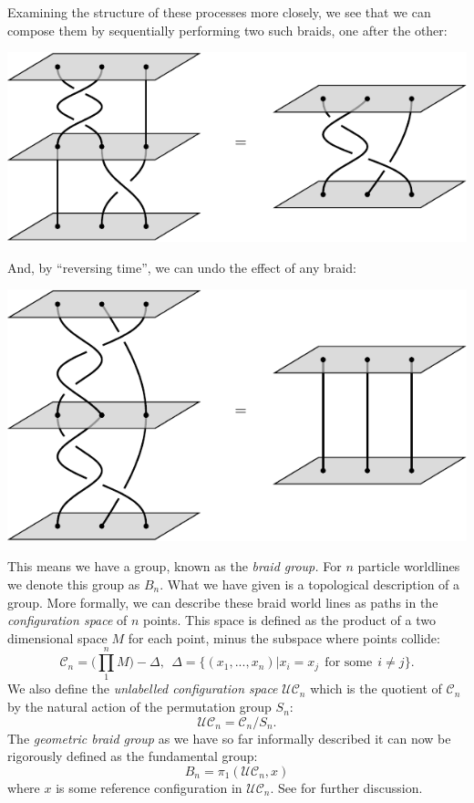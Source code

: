 \documentclass[aps, prl, letterpaper, twocolumn, superscriptaddress, notitlepage, 10pt]{revtex4-1}
\begin{document}
Examining the structure of these processes more closely,
we see that we can compose them by sequentially performing
two such braids, one after the other:
\begin{center}
\includegraphics[]{pic-braid-compose.pdf}
\end{center}
And, by ``reversing time'', we can undo the effect of
any braid:
\begin{center}
\includegraphics[]{pic-braid-inverse.pdf}
\end{center}
This means we have a group, known as the \emph{braid group.}
For $n$ particle worldlines we denote this group as $B_n.$
What we have given is a topological description of a group.
More formally, we can describe these braid world lines as
paths in the \emph{configuration space} of $n$ points.
\newcommand{\Conf}{\mathcal{C}}
\newcommand{\UConf}{\mathcal{UC}}
This space is defined as the product of
a two dimensional space $M$ for each point, minus the subspace where points collide:
$$
    \Conf_n = \bigl( \prod_{1}^{n} M \bigr) - \Delta, \ \ 
    \Delta = \{(x_1, ..., x_n) | x_i = x_j \ \ \mbox{for some} \ \ i\ne j \}.
$$
We also define the \emph{unlabelled configuration space}
$\UConf_n$ which is the quotient of $\Conf_n$ by the natural action of the
permutation group $S_n:$
$$
    \UConf_n = \Conf_n / S_n.
$$
The \emph{geometric braid group} as we have so far informally described it 
can now be rigorously defined as the fundamental group:
$$
    B_n = \pi_1 ( \UConf_n, x )
$$
where $x$ is some reference configuration in $\UConf_n.$
See \cite{Ghrist2014} for further discussion.
\end{document}
